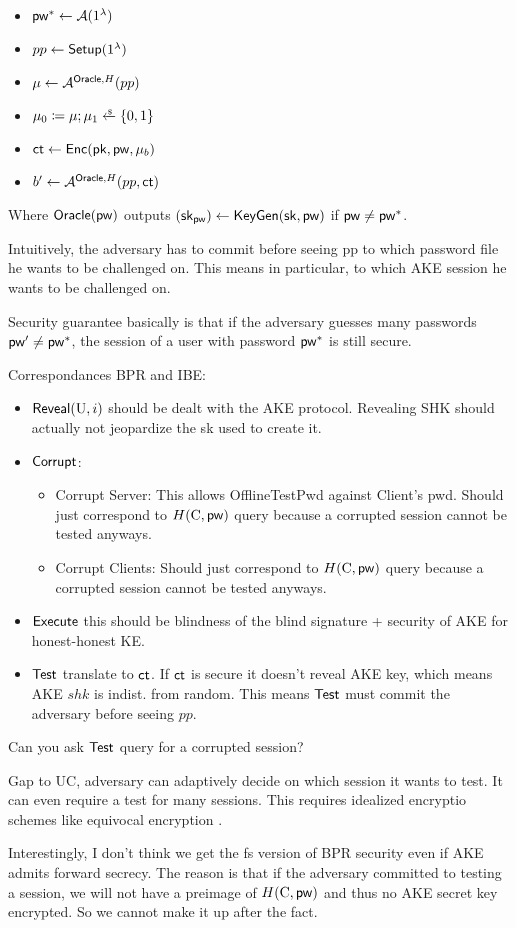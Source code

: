 
\begin{itemize}
    \item $\mathsf{pw}^*\gets\mathcal{A}(1^{\lambda})$
    \item $pp\gets\mathsf{Setup}(1^{\lambda})$
    \item $\mu\gets\mathcal{A}^{\mathsf{Oracle},H}(pp)$
    \item $\mu_0\coloneqq\mu;\mu_1\getsr\{0,1\}$
    \item $\mathsf{ct}\gets\mathsf{Enc}(\mathsf{pk},\mathsf{pw},\mu_b)$
    \item $b'\gets\mathcal{A}^{\mathsf{Oracle},H}(pp,\mathsf{ct})$
\end{itemize}
Where $\mathsf{Oracle}(\mathsf{pw})$ outputs $(\mathsf{sk}_{\mathsf{pw}})\gets\mathsf{KeyGen}(\mathsf{sk},\mathsf{pw})$ if $\mathsf{pw}\neq\mathsf{pw}^*$.


Intuitively, the adversary has to commit before seeing pp to which password file he wants to be challenged on. This means in particular, to which AKE session he wants to be challenged on.

Security guarantee basically is that if the adversary guesses many passwords $\mathsf{pw}'\neq\mathsf{pw}^*$,
the session of a user with password $\mathsf{pw}^*$ is still secure.

Correspondances BPR and IBE:
\begin{itemize}
    \item $\mathsf{Reveal}(\mathrm{U},i)$ should be dealt with the AKE protocol. Revealing SHK should actually not jeopardize the sk used to create it.
    \item $\mathsf{Corrupt}$:
    \begin{itemize}
        \item Corrupt Server: This allows OfflineTestPwd against Client's pwd. Should just correspond to $H(\mathrm{C},\mathsf{pw})$ query because a corrupted session cannot be tested anyways.
        \item Corrupt Clients: Should just correspond to $H(\mathrm{C},\mathsf{pw})$ query because a corrupted session cannot be tested anyways.
    \end{itemize} 
    \item $\mathsf{Execute}$ this should be blindness of the blind signature + security of AKE for honest-honest KE.
    \item $\mathsf{Test}$ translate to $\mathsf{ct}$. If $\mathsf{ct}$ is secure it doesn't reveal AKE key, which means AKE $shk$ is indist. from random.
    This means $\mathsf{Test}$ must commit the adversary before seeing $pp$.
\end{itemize}
Can you ask $\mathsf{Test}$ query for a corrupted session?

Gap to UC, adversary can adaptively decide on which session it wants to test.
It can even require a test for many sessions.
This requires idealized encryptio schemes like
equivocal encryption \cite{EC:JarKraXu18}.

Interestingly, I don't think we get the fs version of BPR security even if AKE admits forward secrecy.
The reason is that if the adversary committed to testing a session, we will not have a preimage of $H(\mathrm{C},\mathsf{pw})$ and thus no AKE secret key encrypted. So we cannot make it up after the fact.